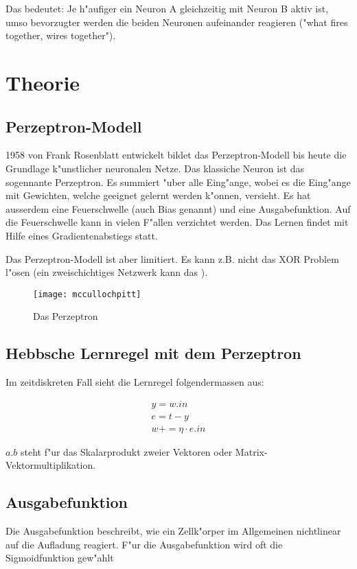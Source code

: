 \documentclass[10pt]{article}
\begin{document}
Das bedeutet: Je h"aufiger ein Neuron A gleichzeitig mit Neuron B aktiv ist, umso bevorzugter werden die beiden Neuronen aufeinander reagieren ("what fires together, wires together").

\section{Theorie}
\subsection{Perzeptron-Modell}

1958 von Frank Rosenblatt entwickelt bildet das Perzeptron-Modell bis heute die Grundlage k"unstlicher neuronalen Netze. Das klassiche Neuron ist das sogennante Perzeptron. Es summiert "uber alle Eing"ange, wobei es die Eing"ange mit Gewichten, welche geeignet gelernt werden k"onnen, versieht. Es hat ausserdem eine Feuerschwelle (auch Bias genannt) und eine Ausgabefunktion. Auf die Feuerschwelle kann in vielen F"allen verzichtet werden.
Das Lernen findet mit Hilfe eines Gradientenabstiegs statt.

Das Perzeptron-Modell ist aber limitiert. Es kann z.B. nicht das XOR Problem l"osen (ein zweischichtiges Netzwerk kann das \cite{rojas}).

\begin{figure}[h!]
\centering
\texttt{[image: mccullochpitt]}
\caption{Das Perzeptron\cite{perzeptron}}
\end{figure}	

\subsection{Hebbsche Lernregel mit dem Perzeptron}

Im zeitdiskreten Fall sieht die Lernregel folgendermassen aus:

\begin{align}
y = w.in\\
e = t - y\\
w += \eta\cdot e.in
\end{align}

$a.b$ steht f"ur das Skalarprodukt zweier Vektoren oder Matrix-Vektormultiplikation.
\subsection{Ausgabefunktion}

Die Ausgabefunktion beschreibt, wie ein Zellk"orper im Allgemeinen nichtlinear auf die Aufladung reagiert. F"ur die Ausgabefunktion wird oft die Sigmoidfunktion gew"ahlt
\end{document}
